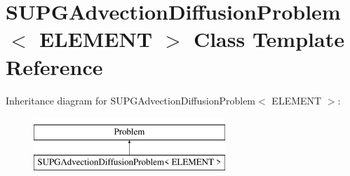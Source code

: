 \hypertarget{classSUPGAdvectionDiffusionProblem}{}\section{S\+U\+P\+G\+Advection\+Diffusion\+Problem$<$ E\+L\+E\+M\+E\+NT $>$ Class Template Reference}
\label{classSUPGAdvectionDiffusionProblem}
Inheritance diagram for S\+U\+P\+G\+Advection\+Diffusion\+Problem$<$ E\+L\+E\+M\+E\+NT $>$\+:\begin{figure}[H]
\begin{center}
\leavevmode
\includegraphics[height=2.000000cm]{classSUPGAdvectionDiffusionProblem}
\end{center}
\end{figure}
